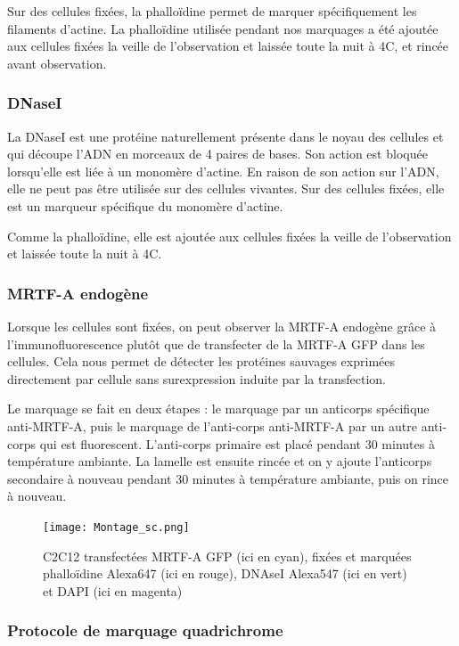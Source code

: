 		Sur des cellules fixées, la phalloïdine permet de marquer spécifiquement les filaments d'actine. La phalloïdine   utilisée pendant nos marquages a été ajoutée aux cellules fixées la veille de l'observation et laissée toute la nuit à 4\degres C, et rincée avant observation. 
		\subsubsection{DNaseI}
		La DNaseI est une protéine naturellement présente dans le noyau des cellules et qui découpe l'ADN en morceaux de 4 paires de bases. Son action est bloquée lorsqu'elle est liée à un monomère d'actine. En raison de son action sur l'ADN, elle ne peut pas être utilisée sur des cellules vivantes. Sur des cellules fixées, elle est un marqueur spécifique du monomère d'actine. 
		
		Comme la phalloïdine, elle est ajoutée aux cellules fixées la veille de l'observation et laissée toute la nuit à 4\degres   C. 
		\subsubsection{MRTF-A endogène}
		
		Lorsque les cellules sont fixées, on peut observer la MRTF-A endogène grâce à l'immunofluorescence plutôt que de transfecter de la MRTF-A GFP dans les cellules. Cela nous permet de détecter les protéines sauvages exprimées directement par cellule sans surexpression induite par la transfection. 
		
		Le marquage se fait en deux étapes : le marquage par un anticorps spécifique anti-MRTF-A, puis le marquage de l'anti-corps anti-MRTF-A par un autre anti-corps qui est fluorescent. L'anti-corps primaire est placé pendant 30 minutes à température ambiante. La lamelle est ensuite rincée et on y ajoute l'anticorps secondaire à nouveau pendant 30 minutes à température ambiante, puis on rince à nouveau. 
		 
				
		\begin{figure}
		\texttt{[image: Montage\_sc.png]}
		\caption{C2C12 transfectées MRTF-A GFP (ici en cyan), fixées et marquées phalloïdine Alexa647 (ici en rouge), DNAseI Alexa547 (ici en vert) et DAPI (ici en magenta)}
		\end{figure}

\subsubsection{Protocole de marquage quadrichrome}
